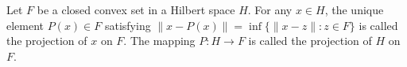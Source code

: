 Let $F$ be a closed convex set in a Hilbert space $H$. For any $x \in H$, the unique element $P(x) \in F$ satisfying $\|x - P(x)\| = \inf \{ \|x - z\| : z \in F \}$ is called the projection of $x$ on $F$. The mapping $P: H \to F$ is called the projection of $H$ on $F$.
